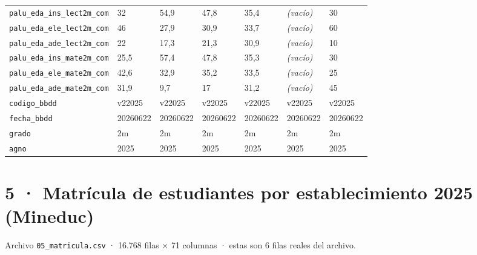 \documentclass[10pt]{article}
\begin{document}
\begin{xltabular}{\linewidth}{@{}p{4.3cm} Y Y Y Y Y Y @{}}
\texttt{palu\_\allowbreak{}eda\_\allowbreak{}ins\_\allowbreak{}lect2m\_\allowbreak{}com} & 32 & 54,9 & 47,8 & 35,4 & \textit{\color{gris}(vacío)} & 30 \\
\texttt{palu\_\allowbreak{}eda\_\allowbreak{}ele\_\allowbreak{}lect2m\_\allowbreak{}com} & 46 & 27,9 & 30,9 & 33,7 & \textit{\color{gris}(vacío)} & 60 \\
\texttt{palu\_\allowbreak{}eda\_\allowbreak{}ade\_\allowbreak{}lect2m\_\allowbreak{}com} & 22 & 17,3 & 21,3 & 30,9 & \textit{\color{gris}(vacío)} & 10 \\
\texttt{palu\_\allowbreak{}eda\_\allowbreak{}ins\_\allowbreak{}mate2m\_\allowbreak{}com} & 25,5 & 57,4 & 47,8 & 35,3 & \textit{\color{gris}(vacío)} & 30 \\
\texttt{palu\_\allowbreak{}eda\_\allowbreak{}ele\_\allowbreak{}mate2m\_\allowbreak{}com} & 42,6 & 32,9 & 35,2 & 33,5 & \textit{\color{gris}(vacío)} & 25 \\
\texttt{palu\_\allowbreak{}eda\_\allowbreak{}ade\_\allowbreak{}mate2m\_\allowbreak{}com} & 31,9 & 9,7 & 17 & 31,2 & \textit{\color{gris}(vacío)} & 45 \\
\texttt{codigo\_\allowbreak{}bbdd} & v22025 & v22025 & v22025 & v22025 & v22025 & v22025 \\
\texttt{fecha\_\allowbreak{}bbdd} & 20260622 & 20260622 & 20260622 & 20260622 & 20260622 & 20260622 \\
\texttt{grado} & 2m & 2m & 2m & 2m & 2m & 2m \\
\texttt{agno} & 2025 & 2025 & 2025 & 2025 & 2025 & 2025 \\
\end{xltabular}
\normalsize

\clearpage
\hypertarget{base5}{}
\section{5 · Matrícula de estudiantes por establecimiento 2025 (Mineduc)}
\small Archivo \texttt{05\_matricula.csv} · 16.768 filas × 71 columnas · estas son 6 filas reales del archivo.\normalsize
\end{document}
